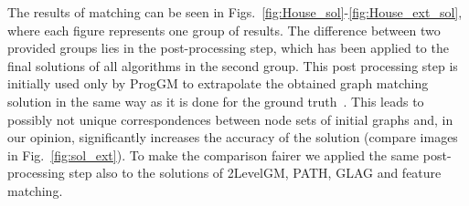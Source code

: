 The results of matching can be seen in Figs.~\ref{fig:House_sol}-\ref{fig:House_ext_sol}, where each figure represents one group of results. The difference between two provided groups lies in the post-processing step, which has been applied to the final solutions of all algorithms in the second group. This post processing step is initially used only by ProgGM to extrapolate the obtained graph matching solution in the same way as it is done for the ground truth~\cite{Cho2012_ProgressiveGM}. This leads to possibly not unique correspondences between node sets of initial graphs and, in our opinion, significantly increases the accuracy of the solution (compare images in Fig.~\ref{fig:sol_ext}). To make the comparison fairer we applied the same post-processing step also to the solutions of 2LevelGM, PATH, GLAG and feature matching.

